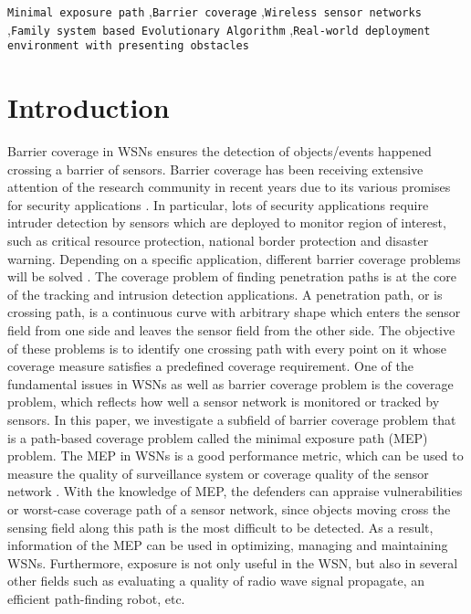 \documentclass[final]{elsarticle}
\begin{document}
\begin{frontmatter}
\begin{abstract}
\end{abstract}
\begin{keyword}
\texttt{Minimal exposure path} \sep\texttt{Barrier coverage} \sep \texttt{Wireless sensor networks} \sep \texttt{Family system based Evolutionary Algorithm} \sep \texttt{Real-world deployment environment with presenting obstacles}
\end{keyword}
\end{frontmatter}
\section{Introduction}
Barrier coverage in WSNs ensures the detection of objects/events happened crossing a barrier of sensors. Barrier coverage has been receiving extensive attention of the research community in recent years due to its various promises for security applications \cite{wu2016survey,wang2011coverage,b15}. In particular, lots of security applications require intruder detection by sensors which are deployed to monitor region of interest, such as critical resource protection, national border protection and disaster warning. Depending on a specific application, different barrier coverage problems will be solved . The coverage problem of finding penetration paths is at the core of the tracking and intrusion detection applications. A penetration path, or  is crossing path, is a continuous curve with arbitrary shape which enters the sensor field from one side and leaves the sensor field from the other side. The objective of these problems is to identify one crossing path with every point on it whose coverage measure satisfies a predefined coverage requirement. One of the fundamental issues in WSNs as well as barrier coverage problem is the coverage problem, which reflects how well a sensor network is monitored or tracked by sensors. In this paper, we investigate a subfield of barrier coverage problem that is a path-based coverage problem called the minimal exposure path (MEP) problem. The MEP in WSNs is a good performance metric, which can be used to measure the quality of surveillance system or coverage quality of the sensor network \cite{b13,b17}. With the knowledge of MEP, the defenders can appraise vulnerabilities or worst-case coverage path of a sensor network, since objects moving cross the sensing field along this path is the most difficult to be detected. As a result, information of the MEP can be used in optimizing, managing and maintaining WSNs. Furthermore, exposure is not only useful in the WSN, but also in several other fields such as evaluating a quality of radio wave signal propagate, an efficient path-finding robot, etc.
\end{document}
